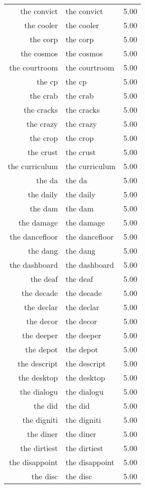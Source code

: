 \begin{table}[ht]
\begin{tabular}{rlr}
  the convict & the convict & 5.00 \\ 
  the cooler & the cooler & 5.00 \\ 
  the corp & the corp & 5.00 \\ 
  the cosmos & the cosmos & 5.00 \\ 
  the courtroom & the courtroom & 5.00 \\ 
  the cp & the cp & 5.00 \\ 
  the crab & the crab & 5.00 \\ 
  the cracks & the cracks & 5.00 \\ 
  the crazy & the crazy & 5.00 \\ 
  the crop & the crop & 5.00 \\ 
  the crust & the crust & 5.00 \\ 
  the curriculum & the curriculum & 5.00 \\ 
  the da & the da & 5.00 \\ 
  the daily & the daily & 5.00 \\ 
  the dam & the dam & 5.00 \\ 
  the damage & the damage & 5.00 \\ 
  the dancefloor & the dancefloor & 5.00 \\ 
  the dang & the dang & 5.00 \\ 
  the dashboard & the dashboard & 5.00 \\ 
  the deaf & the deaf & 5.00 \\ 
  the decade & the decade & 5.00 \\ 
  the declar & the declar & 5.00 \\ 
  the decor & the decor & 5.00 \\ 
  the deeper & the deeper & 5.00 \\ 
  the depot & the depot & 5.00 \\ 
  the descript & the descript & 5.00 \\ 
  the desktop & the desktop & 5.00 \\ 
  the dialogu & the dialogu & 5.00 \\ 
  the did & the did & 5.00 \\ 
  the digniti & the digniti & 5.00 \\ 
  the diner & the diner & 5.00 \\ 
  the dirtiest & the dirtiest & 5.00 \\ 
  the disappoint & the disappoint & 5.00 \\ 
  the disc & the disc & 5.00 \\ 

\end{tabular}
\end{table}
